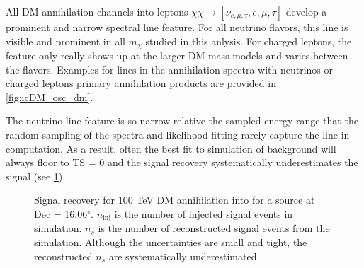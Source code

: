 All DM annihilation channels into leptons $ \chi\chi \rightarrow [\nu_{e, \mu, \tau}, e, \mu,\tau] $ develop a prominent and narrow spectral line feature.
For all neutrino flavors, this line is visible and prominent in all $m_\chi$ studied in this anlysis.
For charged leptons, the feature only really shows up at the larger DM mass models and varies between the flavors.
Examples for lines in the annihilation spectra with neutrinos or charged leptons primary annihilation products are provided in \cref{fig:icDM_osc_dm}.

The neutrino line feature is so narrow relative the sampled energy range that the random sampling of the spectra and likelihood fitting rarely capture the line in computation.
As a result, often the best fit to simulation of background will always floor to TS = 0 and the signal recovery systematically underestimates the signal (see \cref{fig:sig_recovery_fail}).

\begin{figure}[t]
    \caption{Signal recovery for 100 TeV DM annihilation into \parpar{\nu_\mu} for a source at Dec = 16.06$^\circ$. $n_\mathrm{inj}$ is the number of injected signal events in simulation. $n_s$ is the number of reconstructed signal events from the simulation. Although the uncertainties are small and tight, the reconstructed $ n_s $ are systematically underestimated.} \label{fig:sig_recovery_fail}
\end{figure}

